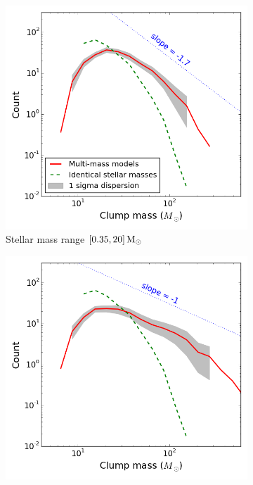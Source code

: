  \begin{figure}
\center
    \centering
    \begin{subfigure}[b]{0.49\textwidth}
    	\centering
    	\includegraphics[width=\textwidth]{Figures/2_ClumpMF_MF_1}
        \caption{Stellar mass range $[0.35, 20]\, {\textrm{M}_\odot}$ }
        \label{Fig:2_ClumpMF_MF_1}
    \end{subfigure}
    \begin{subfigure}[b]{0.49\textwidth}
    	\centering
    	\includegraphics[width=\textwidth]{Figures/2_ClumpMF_MF_2}

\end{subfigure}
\end{figure}
